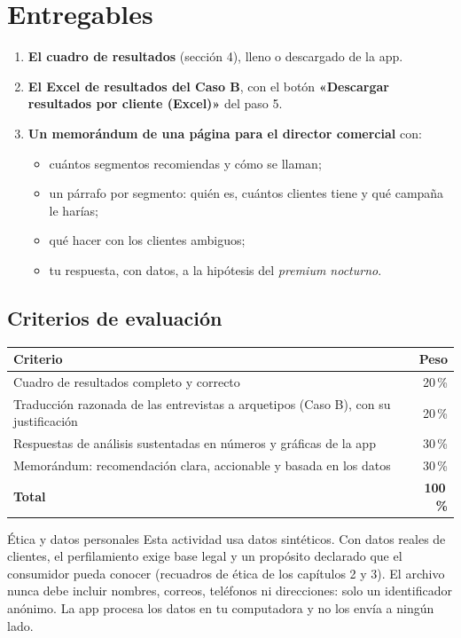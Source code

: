 \documentclass[11pt,letterpaper]{article}
\newcommand{\app}[1]{\textbf{\color{guindaOsc}«#1»}}
\begin{document}
\section{Entregables}
\begin{enumerate}[leftmargin=*,label=\textbf{\color{guinda}\arabic*.}]
\item \textbf{El cuadro de resultados} (secci\'on 4), lleno o descargado de la app.
\item \textbf{El Excel de resultados del Caso B}, con el bot\'on \app{Descargar resultados por cliente (Excel)} del paso 5.
\item \textbf{Un memor\'andum de una p\'agina para el director comercial} con:
  \begin{itemize}
  \item cu\'antos segmentos recomiendas y c\'omo se llaman;
  \item un p\'arrafo por segmento: qui\'en es, cu\'antos clientes tiene y qu\'e campa\~na le har\'ias;
  \item qu\'e hacer con los clientes ambiguos;
  \item tu respuesta, con datos, a la hip\'otesis del \emph{premium nocturno}.
  \end{itemize}
\end{enumerate}

\subsection{Criterios de evaluaci\'on}
\begin{center}
\begin{tabularx}{\linewidth}{@{}Xr@{}}
\toprule
\rowcolor{guinda}\color{white}\textbf{Criterio} & \color{white}\textbf{Peso} \\
\midrule
Cuadro de resultados completo y correcto & 20\,\% \\
\rowcolor{guindaClara}Traducci\'on razonada de las entrevistas a arquetipos (Caso B), con su justificaci\'on & 20\,\% \\
Respuestas de an\'alisis sustentadas en n\'umeros y gr\'aficas de la app & 30\,\% \\
\rowcolor{guindaClara}Memor\'andum: recomendaci\'on clara, accionable y basada en los datos & 30\,\% \\
\midrule
\textbf{Total} & \textbf{100\,\%} \\
\bottomrule
\end{tabularx}
\end{center}

\begin{aviso}{\'Etica y datos personales}
Esta actividad usa datos sint\'eticos. Con datos reales de clientes, el perfilamiento exige base legal y un prop\'osito declarado que el consumidor pueda conocer (recuadros de \'etica de los cap\'itulos 2 y 3). El archivo nunca debe incluir nombres, correos, tel\'efonos ni direcciones: solo un identificador an\'onimo. La app procesa los datos en tu computadora y no los env\'ia a ning\'un lado.
\end{aviso}
\end{document}
